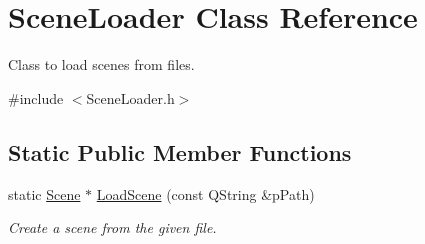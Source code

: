 \hypertarget{class_scene_loader}{\section{Scene\+Loader Class Reference}
\label{class_scene_loader}
}


Class to load scenes from files.  




{\ttfamily \#include $<$Scene\+Loader.\+h$>$}

\subsection*{Static Public Member Functions}
\begin{DoxyCompactItemize}
\item 
static \hyperlink{class_scene}{Scene} $\ast$ \hyperlink{class_scene_loader_a2b8b239816e455607c90c6b3e9ffe937}{Load\+Scene} (const Q\+String \&p\+Path)
\begin{DoxyCompactList}\small\item\em Create a scene from the given file. \end{DoxyCompactList}\end{DoxyCompactItemize}
